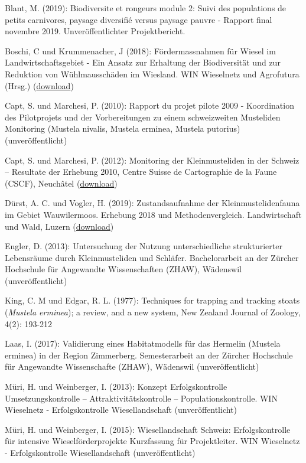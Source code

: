 \documentclass[
  oneside]{scrbook}
\begin{document}
Blant, M. (2019): Biodiversite et rongeurs module 2: Suivi des populations de petits carnivores, paysage diversifié versus paysage pauvre - Rapport final novembre 2019. Unveröffentlichter Projektbericht.

Boschi, C und Krummenacher, J (2018): Fördermassnahmen für Wiesel im Landwirtschaftsgebiet - Ein Ansatz zur Erhaltung der Biodiversität und zur Reduktion von Wühlmausschäden im Wiesland. WIN Wieselnetz und Agrofutura (Hrsg.) (\href{http://wieselnetz.ch/wp-content/uploads/2018/02/Heft_Wieselfoerdermassnahmen_D_Ed2_CMYK.pdf}{download})

Capt, S. und Marchesi, P. (2010): Rapport du projet pilote 2009 - Koordination des Pilotprojets und der Vorbereitungen zu einem schweizweiten Musteliden Monitoring (Mustela nivalis, Mustela erminea, Mustela putorius) (unveröffentlicht)

Capt, S. und Marchesi, P. (2012): Monitoring der Kleinmusteliden in der Schweiz -- Resultate der Erhebung 2010, Centre Suisse de Cartographie de la Faune (CSCF), Neuchâtel (\href{http://wieselnetz.ch/wp-content/uploads/2016/03/CSCF_Bericht_Monitoring_2010.pdf}{download})

Dürst, A. C. und Vogler, H. (2019): Zustandsaufnahme der Kleinmustelidenfauna im Gebiet Wauwilermoos. Erhebung 2018 und Methodenvergleich. Landwirtschaft und Wald, Luzern (\href{https://lawa.lu.ch/-/media/LAWA/Dokumente/njf/jagd/wildhut/BE_Kleinmusteliden.pdf?la=de-CH\&hash=36F5693ABEA00418BC192264A90DDDC4D95D10A0}{download})

Engler, D. (2013): Untersuchung der Nutzung unterschiedliche strukturierter Lebensräume durch Kleinmusteliden und Schläfer. Bachelorarbeit an der Zürcher Hochschule für Angewandte Wissenschaften (ZHAW), Wädenswil (unveröffentlicht)

King, C. M und Edgar, R. L. (1977): Techniques for trapping and tracking stoats (\emph{Mustela erminea}); a review, and a new system, New Zealand Journal of Zoology, 4(2): 193-212

Laas, I. (2017): Validierung eines Habitatmodells für das Hermelin (Mustela erminea) in der Region Zimmerberg. Semesterarbeit an der Zürcher Hochschule für Angewandte Wissenschafte (ZHAW), Wädenswil (unveröffentlicht)

Müri, H. und Weinberger, I. (2013): Konzept Erfolgskontrolle Umsetzungskontrolle -- Attraktivitätskontrolle -- Populationskontrolle. WIN Wieselnetz - Erfolgskontrolle Wiesellandschaft (unveröffentlicht)

Müri, H. und Weinberger, I. (2015): Wiesellandschaft Schweiz: Erfolgskontrolle für intensive Wieselförderprojekte Kurzfassung für Projektleiter. WIN Wieselnetz - Erfolgskontrolle Wiesellandschaft (unveröffentlicht)
\end{document}

